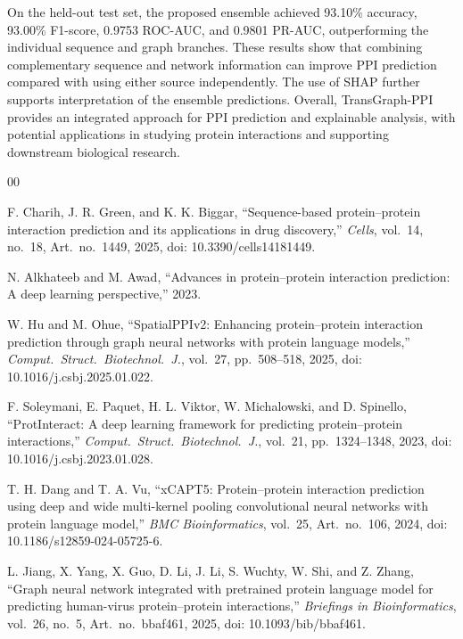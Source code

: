 \documentclass[conference]{IEEEtran}
\begin{document}
On the held-out test set, the proposed ensemble achieved 93.10\% accuracy,
93.00\% F1-score, 0.9753 ROC-AUC, and 0.9801 PR-AUC, outperforming the
individual sequence and graph branches. These results show that combining
complementary sequence and network information can improve PPI prediction
compared with using either source independently. The use of SHAP further
supports interpretation of the ensemble predictions. Overall, TransGraph-PPI
provides an integrated approach for PPI prediction and explainable analysis,
with potential applications in studying protein interactions and supporting
downstream biological research.

\begin{thebibliography}{00}

F. Charih, J. R. Green, and K. K. Biggar,
``Sequence-based protein--protein interaction prediction and its applications
in drug discovery,''
\textit{Cells}, vol.~14, no.~18, Art.~no.~1449, 2025,
doi: 10.3390/cells14181449.

N. Alkhateeb and M. Awad,
``Advances in protein--protein interaction prediction: A deep learning
perspective,'' 2023.

W. Hu and M. Ohue,
``SpatialPPIv2: Enhancing protein--protein interaction prediction through graph
neural networks with protein language models,''
\textit{Comput.\ Struct.\ Biotechnol.\ J.}, vol.~27, pp.~508--518, 2025,
doi: 10.1016/j.csbj.2025.01.022.

F. Soleymani, E. Paquet, H. L. Viktor, W. Michalowski, and D. Spinello,
``ProtInteract: A deep learning framework for predicting protein--protein
interactions,''
\textit{Comput.\ Struct.\ Biotechnol.\ J.}, vol.~21, pp.~1324--1348, 2023,
doi: 10.1016/j.csbj.2023.01.028.

T. H. Dang and T. A. Vu,
``xCAPT5: Protein--protein interaction prediction using deep and wide
multi-kernel pooling convolutional neural networks with protein language
model,''
\textit{BMC Bioinformatics}, vol.~25, Art.~no.~106, 2024,
doi: 10.1186/s12859-024-05725-6.

L. Jiang, X. Yang, X. Guo, D. Li, J. Li, S. Wuchty, W. Shi, and Z. Zhang,
``Graph neural network integrated with pretrained protein language model for
predicting human-virus protein--protein interactions,''
\textit{Briefings in Bioinformatics}, vol.~26, no.~5, Art.~no.~bbaf461, 2025,
doi: 10.1093/bib/bbaf461.


\end{thebibliography}
\end{document}
